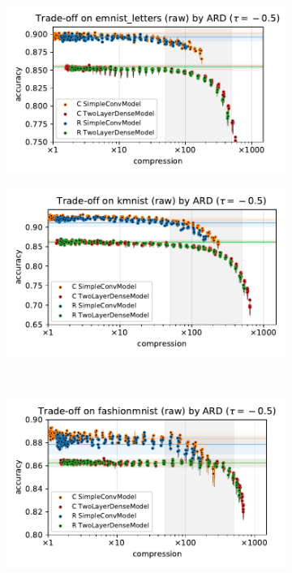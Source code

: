 \documentclass[a4paper,10pt,onecolumn]{article}
\begin{document}
\begin{figure}[b]
  \centering
  \begin{subfigure}[b]{0.5\columnwidth}
    \centering
    \includegraphics[width=\linewidth]{figure__mnist-like__trade-off/appendix__ARD__emnist_letters__raw__-0.5.pdf}
  \end{subfigure}%
  \begin{subfigure}[b]{0.5\columnwidth}
    \centering
    \includegraphics[width=\linewidth]{figure__mnist-like__trade-off/appendix__ARD__kmnist__raw__-0.5.pdf}
  \end{subfigure} \\%
  \begin{subfigure}[b]{0.5\columnwidth}
    \centering
    \includegraphics[width=\linewidth]{figure__mnist-like__trade-off/appendix__ARD__fashionmnist__raw__-0.5.pdf}

\end{subfigure}
\end{figure}
\end{document}
